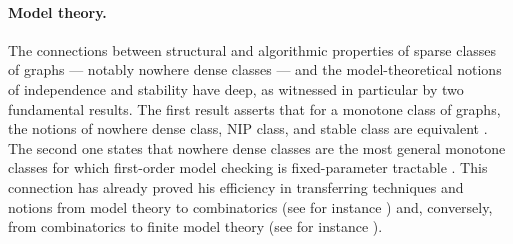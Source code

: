 \paragraph*{Model theory.}
The connections between structural and algorithmic properties of sparse classes of graphs --- notably nowhere dense classes --- and the model-theoretical notions of independence and stability have deep, as witnessed in particular by two fundamental results. The first result asserts that for a monotone class of graphs, the notions of nowhere dense class, NIP class, and stable class are equivalent \cite{adler2014interpreting}. The second one states that nowhere dense classes are the most general monotone classes for which first-order model checking is fixed-parameter tractable \cite{grohe2017deciding}. This connection has already proved his efficiency in transferring techniques and notions from model theory to combinatorics (see for instance \cite{pilipczuk2018number}) and, conversely, from combinatorics to finite model theory (see for instance \cite{rossman2008homomorphism}).